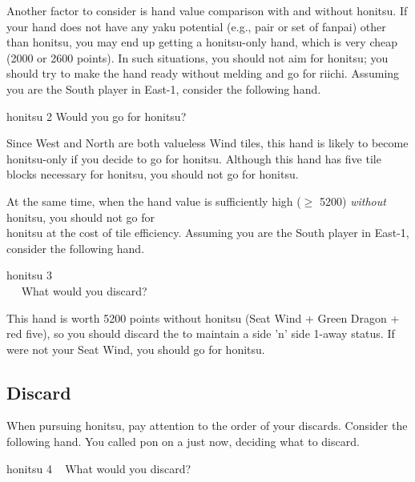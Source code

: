 Another factor to consider is hand value comparison with and without {\jap honitsu}. If your hand does not have any {\jap yaku} potential (e.g., pair or set of {\jap fanpai}) other than {\jap honitsu}, you may end up getting a {\jap honitsu}-only hand, which is very cheap (2000 or 2600 points). In such situations, you should not aim for {\jap honitsu}; you should try to make the hand ready without melding and go for {\jap riichi}. Assuming you are the South player in East-1, consider the following hand.
\begin{itembox}[r]{{\jap honitsu} 2}
\bp
{}\xi\xi\bei\bei
\ep
\vspace{-10pt}Would you go for {\jap honitsu}? \vspace{-5pt}
\end{itembox}
\noindent
Since West and North are both valueless Wind tiles, this hand is likely to become {\jap honitsu}-only if you decide to go for {\jap honitsu}. Although this hand has five tile blocks necessary for {\jap honitsu}, you should not go for {\jap honitsu}. 

\bigskip
At the same time, when the hand value is sufficiently high ($\geq$ 5200) \emph{without} {\jap honitsu}, you should not go for \\{\jap honitsu} at the cost of tile efficiency. Assuming you are the South player in East-1, consider the following hand.\begin{itembox}[r]{{\jap honitsu} 3}
\bp \vspace{-10pt}
\\ \vspace{-18pt}
\rfw{}\fa\fa\fa\xi~~\nan\nan\rnan
\ep
\vspace{-10pt}What would you discard? \vspace{-5pt}
\end{itembox}

\bigskip
\noindent This hand is worth 5200 points without {\jap honitsu} (Seat Wind + Green Dragon + red five), so you should discard the {\large{}} to maintain a side 'n' side 1-away status. If {\large\nan} were not your Seat Wind, you should go for {\jap honitsu}.

\newpage
\subsection{Discard}
When pursuing {\jap honitsu}, pay attention to the order of your discards. 
Consider the following hand. You called {\jap pon} on a {\large\bai} just now, deciding what to discard. 
\begin{itembox}[r]{{\jap honitsu} 4}
\bp
{}\bei\bei\zhong~\bai\bai\rbai
\ep
\vspace{-10pt}What would you discard? \vspace{-5pt}
\end{itembox}

